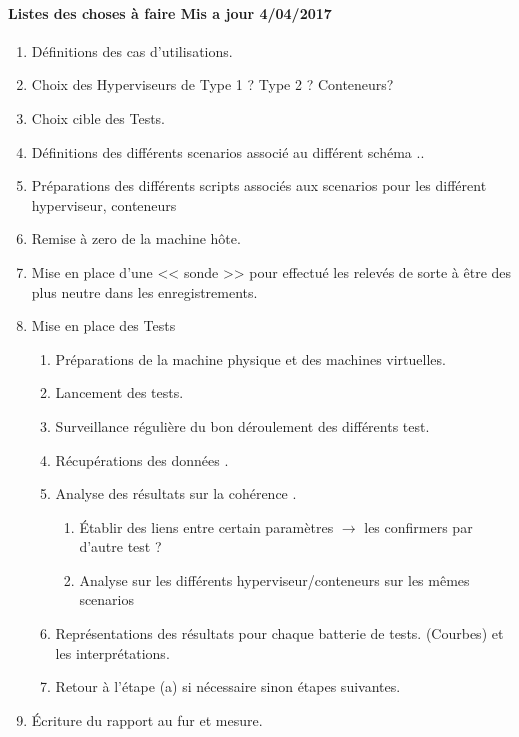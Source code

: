 \documentclass[french]{article}
\begin{document}
\paragraph{Listes des choses à faire Mis a jour 4/04/2017}
\begin{enumerate}
	\item Définitions des cas d'utilisations. 
	\item Choix des Hyperviseurs de Type 1 ? Type 2 ? Conteneurs?
	\item Choix cible des Tests.
	\item Définitions des différents scenarios associé au différent schéma ..
	\item Préparations des différents scripts associés aux scenarios pour les différent hyperviseur, conteneurs 
	\item Remise à zero de la machine hôte.
	\item Mise en place d'une << sonde >> pour effectué les relevés de sorte à être des plus neutre dans les enregistrements.
	\item Mise en place des Tests 
		\begin{enumerate}
			\item Préparations de la machine physique et des machines virtuelles. 
			\item Lancement des tests.
			\item Surveillance régulière du bon déroulement des différents test.
			\item Récupérations des données . 
			\item Analyse des résultats sur la cohérence .
			\begin{enumerate}
				\item Établir des liens entre certain paramètres $\rightarrow $ les confirmers par d'autre test ? 
				\item Analyse sur les différents hyperviseur/conteneurs sur les mêmes scenarios 
			\end{enumerate}
			\item Représentations des résultats pour chaque batterie de tests. (Courbes) et les interprétations.
			\item Retour à l’étape (a) si nécessaire sinon étapes suivantes.
		\end{enumerate}
	\item Écriture du rapport au fur et mesure.	
			
\end{enumerate}
\end{document}
